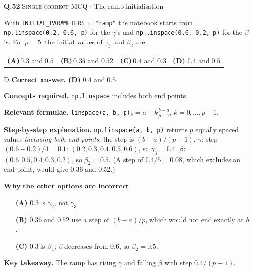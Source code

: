 \documentclass[11pt,a4paper]{article}
\newcommand{\optlabel}[1]{\textbf{(#1)}}
\newcommand{\correctlabel}[1]{\textcolor{okgreen}{\textbf{(#1)}\,\ding{51}}}
\newenvironment{qitem}[1]{\begin{list}{}{\setlength{\leftmargin}{3.3em}\setlength{\labelwidth}{3.1em}%
  \setlength{\labelsep}{0.2em}\setlength{\topsep}{3pt}\setlength{\parsep}{3pt}}\item[\textbf{Q.#1}\hfill]}{\end{list}}
\newcommand{\qsep}{\par\vspace{2pt}{\color{black!15}\hrule}\vspace{4pt}}
\newcommand{\qmeta}[2]{{\footnotesize\color{black!60}\textsc{#1} \;$\cdot$\; #2}\par}
\begin{document}
\begin{qitem}{52}
\qmeta{Single-correct MCQ}{The ramp initialisation}
With \texttt{INITIAL\_PARAMETERS = "ramp"} the notebook starts from \texttt{np.linspace(0.2, 0.6, p)} for the $\gamma$'s and
\texttt{np.linspace(0.6, 0.2, p)} for the $\beta$'s. For $p = 5$, the initial values of $\gamma_3$ and $\beta_2$ are
\par\smallskip\noindent\begin{tabularx}{\linewidth}{@{}*{4}{L}@{}}
\optlabel{A}\,$0.3$ and $0.5$ & \optlabel{B}\,$0.36$ and $0.52$ & \optlabel{C}\,$0.4$ and $0.3$ & \correctlabel{D}\,$0.4$ and $0.5$
\end{tabularx}
\end{qitem}
\begin{solbox}{D}
\textbf{\color{brand}Correct answer.} \textcolor{okgreen}{\textbf{(D)}} $0.4$ and $0.5$

\textbf{\color{brand}Concepts required.} \texttt{np.linspace} includes both end points.

\textbf{\color{brand}Relevant formulae.} \texttt{linspace(a, b, p)}$_k = a + k\frac{b - a}{p - 1}$, $k = 0, \dots, p-1$.

\textbf{\color{brand}Step-by-step explanation.} \texttt{np.linspace(a, b, p)} returns $p$ equally spaced values \emph{including both end points}; the step is $(b - a)/(p - 1)$.
$\gamma$: step $(0.6 - 0.2)/4 = 0.1$: $(0.2, 0.3, 0.4, 0.5, 0.6)$, so $\gamma_3 = 0.4$.
$\beta$: $(0.6, 0.5, 0.4, 0.3, 0.2)$, so $\beta_2 = 0.5$.
(A step of $0.4/5 = 0.08$, which excludes an end point, would give $0.36$ and $0.52$.)

\textbf{\color{brand}Why the other options are incorrect.}
\begin{itemize}[leftmargin=2.4em, itemsep=1pt, topsep=2pt]
\item[\textbf{(A)}] $0.3$ is $\gamma_2$, not $\gamma_3$.
\item[\textbf{(B)}] $0.36$ and $0.52$ use a step of $(b - a)/p$, which would not end exactly at $b$.
\item[\textbf{(C)}] $0.3$ is $\beta_4$; $\beta$ decreases from $0.6$, so $\beta_2 = 0.5$.
\end{itemize}
\textbf{\color{brand}Key takeaway.} The ramp has rising $\gamma$ and falling $\beta$ with step $0.4/(p-1)$.
\end{solbox}
\qsep
\end{document}
